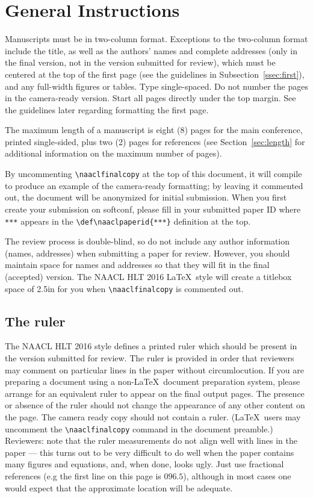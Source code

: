 \documentclass[11pt,letterpaper]{article}
\def\naaclpaperid{***} %
\begin{document}
\section{General Instructions}

Manuscripts must be in two-column format.  Exceptions to the
two-column format include the title, as well as the 
authors' names and complete
addresses (only in the final version, not in the version submitted for review), 
which must be centered at the top of the first page (see
the guidelines in Subsection~\ref{ssec:first}), and any full-width
figures or tables.  Type single-spaced.  Do not number the pages 
in the camera-ready version.
Start all pages directly under the top margin.  See the guidelines
later regarding formatting the first page.

The maximum length of a manuscript is eight (8) pages for the main
conference, printed single-sided, plus two (2) pages for references
(see Section~\ref{sec:length} for additional information on the
maximum number of pages). 

By uncommenting {\small\verb|\naaclfinalcopy|} at the top of this 
 document, it will compile to produce an example of the camera-ready formatting; by leaving it commented out, the document will be anonymized for initial submission.  When you first create your submission on softconf, please fill in your submitted paper ID where {\small\verb|***|} appears in the {\small\verb|\def\naaclpaperid{***}|} definition at the top.

The review process is double-blind, so do not include any author information (names, addresses) when submitting a paper for review.  
However, you should maintain space for names and addresses so that they will fit in the final (accepted) version.  The NAACL HLT 2016 \LaTeX\ style will create a titlebox space of 2.5in for you when {\small\verb|\naaclfinalcopy|} is commented out.  

\subsection{The ruler}
The NAACL HLT 2016 style defines a printed ruler which should be present in the
version submitted for review.  The ruler is provided in order that
reviewers may comment on particular lines in the paper without
circumlocution.  If you are preparing a document using a non-\LaTeX\
document preparation system, please arrange for an equivalent ruler to
appear on the final output pages.  The presence or absence of the ruler
should not change the appearance of any other content on the page.  The
camera ready copy should not contain a ruler. (\LaTeX\ users may uncomment
the {\small\verb|\naaclfinalcopy|} command in the document preamble.)  Reviewers:
note that the ruler measurements do not align well with lines in the paper
--- this turns out to be very difficult to do well when the paper contains
many figures and equations, and, when done, looks ugly.  Just use fractional
references (e.g the first line on this page is $096.5$), although in most cases one would
expect that the approximate location will be adequate.
\end{document}
